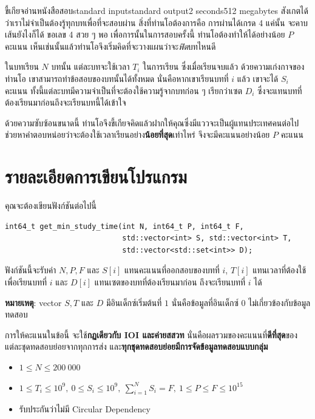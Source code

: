 \documentclass[11pt,a4paper]{article}
\begin{document}
\begin{problem}{ขี้เกียจอ่านหนังสือสอบ}{standard input}{standard output}{2 seconds}{512 megabytes}
สังเกตได้ว่าเราไม่จำเป็นต้องรู้ทุกบทเพื่อที่จะสอบผ่าน สิ่งที่ท่านโอต้องการคือ
การผ่านได้เกรด 4 แค่นั้น จะคาบเส้นยังไงก็ได้ ขอเลข 4 สวย ๆ พอ
เพื่อการนั้นในการสอบครั้งนี้ ท่านโอต้องทำให้ได้อย่างน้อย $P$ คะแนน
เห็นเช่นนั้นแล้วท่านโอจึงเริ่มคิดที่จะวางแผนว่าจะ\textit{ฟิต}บทไหนดี

ในบทเรียน $N$ บทนั้น แต่ละบทจะใช้เวลา $T_i$ ในการเรียน ซึ่งเมื่อเรียนจบแล้ว
ด้วยความเก่งกาจของท่านโอ เขาสามารถทำข้อสอบของบทนั้นได้ทั้งหมด
นั่นคือหากเขาเรียนบทที่ $i$ แล้ว เขาจะได้ $S_i$ คะแนน
ทั้งนี้แต่ละบทมีความจำเป็นที่จะต้องใช้ความรู้จากบทก่อน ๆ เรียกว่าเซต $D_i$
ซึ่งจะแทนบทที่ต้องเรียนมาก่อนถึงจะเรียนบทนี้ได้เข้าใจ

ด้วยความซับซ้อนขนาดนี้ ท่านโอจึงขี้เกียจคิดแล้วฝากให้คุณซึ่งมีแววจะเป็นผู้แทนประเทศคนต่อไป
ช่วยหาคำตอบหน่อยว่าจะต้องใช้เวลาเรียนอย่าง\textbf{น้อยที่สุด}เท่าไหร่
จึงจะมีคะแนนอย่างน้อย $P$ คะแนน

\section*{รายละเอียดการเขียนโปรแกรม}

คุณจะต้องเขียนฟังก์ชันต่อไปนี้

\begin{verbatim}
int64_t get_min_study_time(int N, int64_t P, int64_t F,
                           std::vector<int> S, std::vector<int> T,
                           std::vector<std::set<int>> D);
\end{verbatim}

ฟังก์ชันนี้จะรับค่า $N, P, F$ และ $S[i]$ แทนคะแนนที่ออกสอบของบทที่ $i$,
$T[i]$ แทนเวลาที่ต้องใช้เพื่อเรียนบทที่ $i$ และ $D[i]$
แทนเซตของบทที่ต้องเรียนมาก่อน ถึงจะเรียนบทที่ $i$ ได้

\textbf{หมายเหตุ}: vector $S, T$ และ $D$ มีอินเด็กซ์เริ่มต้นที่ $1$
นั่นคือข้อมูลที่อินเด็กซ์ $0$ ไม่เกี่ยวข้องกับข้อมูลทดสอบ

\Scoring

การให้คะแนนในข้อนี้ จะใช้\textbf{กฏเดียวกับ IOI และค่ายสสวท}
นั่นคือผลรวมของคะแนนที่\textbf{ดีที่สุด}ของแต่ละชุดทดสอบย่อยจากทุกการส่ง และ\textbf{ทุกชุดทดสอบย่อยมีการจัดข้อมูลทดสอบแบบกลุ่ม}

\Constraints

\begin{itemize}
\item $1 \le N \le 200\ 000$
\item $1 \le T_i \le 10^{9},\ 0 \le S_i \le 10^{9},\ \sum_{i=1}^{N} S_i = F,\ 1 \le P \le F \le 10^{15}$
\item รับประกันว่าไม่มี Circular Dependency
\end{itemize}


\end{problem}
\end{document}
